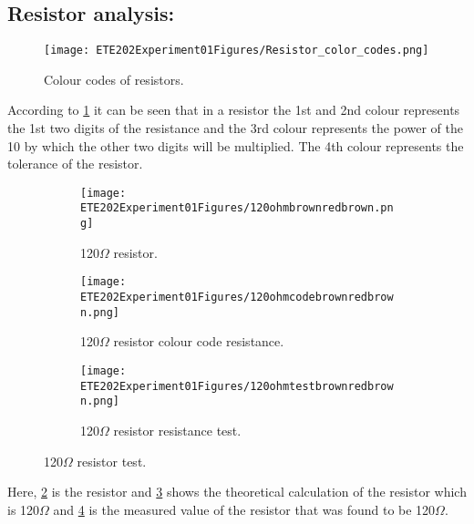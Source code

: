 \documentclass[a4paper, 14pt]{extarticle}
\begin{document}
    \newpage

        \subsection{Resistor analysis:}
            \begin{figure}[h]
            \centering
                \texttt{[image: ETE202Experiment01Figures/Resistor\_color\_codes.png]}
                \caption{Colour codes of resistors.}
                \label{fig:mainfig3}
            \end{figure}
            According to \ref{fig:mainfig3} it can be seen that in a resistor the 1st and 2nd colour represents the 1st two digits of the resistance and the 3rd colour represents the power of the 10 by which the other two digits will be multiplied. The 4th colour represents the tolerance of the resistor.
            
            \newpage
            
            \begin{figure}[htbp]
            \centering
                \begin{subfigure}[H]{0.3\textwidth}
                \centering
                    \texttt{[image: ETE202Experiment01Figures/120ohmbrownredbrown.png]}
                    \caption{120$\Omega$ resistor.}
                    \label{fig:subfig9}
                \end{subfigure}
                \hfill
                \begin{subfigure}[H]{0.3\textwidth}
                \centering
                    \texttt{[image: ETE202Experiment01Figures/120ohmcodebrownredbrown.png]}
                    \caption{120$\Omega$ resistor colour code resistance.}
                    \label{fig:subfig10}
                \end{subfigure}
                \hfill
                \begin{subfigure}[H]{0.3\textwidth}
                \centering
                    \texttt{[image: ETE202Experiment01Figures/120ohmtestbrownredbrown.png]}
                    \caption{120$\Omega$ resistor resistance test.}
                    \label{fig:subfig11}
                \end{subfigure}
                \caption{120$\Omega$ resistor test.}
                \label{fig:mainfig4}
            \end{figure}
            Here, \ref{fig:subfig9} is the resistor and \ref{fig:subfig10} shows the theoretical calculation of the resistor which is 120$\Omega$ and \ref{fig:subfig11} is the measured value of the resistor that was found to be 120$\Omega$.
\end{document}
